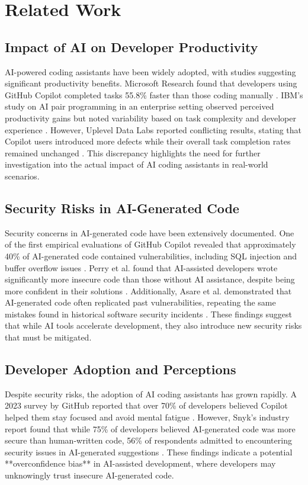 \section{Related Work}

\subsection{Impact of AI on Developer Productivity}
AI-powered coding assistants have been widely adopted, with studies suggesting significant productivity benefits. Microsoft Research found that developers using GitHub Copilot completed tasks 55.8\% faster than those coding manually \cite{microsoft2023}. IBM’s study on AI pair programming in an enterprise setting observed perceived productivity gains but noted variability based on task complexity and developer experience \cite{ibm2025}. However, Uplevel Data Labs reported conflicting results, stating that Copilot users introduced more defects while their overall task completion rates remained unchanged \cite{uplevel2024}. This discrepancy highlights the need for further investigation into the actual impact of AI coding assistants in real-world scenarios.

\subsection{Security Risks in AI-Generated Code}
Security concerns in AI-generated code have been extensively documented. One of the first empirical evaluations of GitHub Copilot revealed that approximately 40\% of AI-generated code contained vulnerabilities, including SQL injection and buffer overflow issues \cite{fu2023}. Perry et al. found that AI-assisted developers wrote significantly more insecure code than those without AI assistance, despite being more confident in their solutions \cite{perry2023}. Additionally, Asare et al. demonstrated that AI-generated code often replicated past vulnerabilities, repeating the same mistakes found in historical software security incidents \cite{asare2024}. These findings suggest that while AI tools accelerate development, they also introduce new security risks that must be mitigated.

\subsection{Developer Adoption and Perceptions}
Despite security risks, the adoption of AI coding assistants has grown rapidly. A 2023 survey by GitHub reported that over 70\% of developers believed Copilot helped them stay focused and avoid mental fatigue \cite{developer-adoption}. However, Snyk’s industry report found that while 75\% of developers believed AI-generated code was more secure than human-written code, 56\% of respondents admitted to encountering security issues in AI-generated suggestions \cite{snyk2023}. These findings indicate a potential **overconfidence bias** in AI-assisted development, where developers may unknowingly trust insecure AI-generated code.

